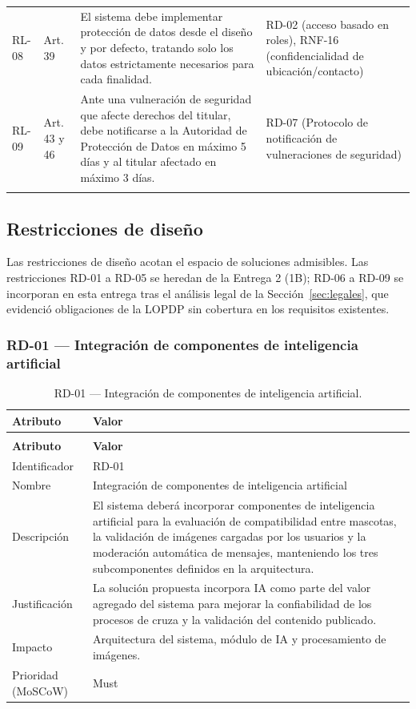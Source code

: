 \documentclass[journal,onecolumn]{IEEEtran}
\makeatletter
\newenvironment{atributos}[2]{%
	\small
	\begin{longtable}{@{}>{\raggedright\arraybackslash}p{4.2cm} >{\raggedright\arraybackslash}p{11.2cm}@{}}
		\caption{#2}\label{tab:#1}\\
		\toprule
		\textbf{Atributo} & \textbf{Valor} \\
		\midrule
		\endfirsthead
		\multicolumn{2}{@{}l}{\small\itshape (continuación)}\\
		\toprule
		\textbf{Atributo} & \textbf{Valor} \\
		\midrule
		\endhead
		\bottomrule
		\endlastfoot
	}{%
	\end{longtable}
	\normalsize
}
\makeatother
\begin{document}
\begin{table}[H]
\begin{tabularx}{\textwidth}{@{}p{1.1cm} p{1.9cm} p{5.4cm} X@{}}
			\addlinespace
			RL-08 & Art. 39 & El sistema debe implementar protección de datos desde el diseño y por defecto, tratando solo los datos estrictamente necesarios para cada finalidad. & RD-02 (acceso basado en roles), RNF-16 (confidencialidad de ubicación/contacto) \\
			\addlinespace
			RL-09 & Art. 43 y 46 & Ante una vulneración de seguridad que afecte derechos del titular, debe notificarse a la Autoridad de Protección de Datos en máximo 5 días y al titular afectado en máximo 3 días. & RD-07 (Protocolo de notificación de vulneraciones de seguridad) \\
			\addlinespace
			\bottomrule
		\end{tabularx}
	\end{table}
	
	\subsection{Restricciones de diseño}
	\label{sec:restricciones}
	
	Las restricciones de diseño acotan el espacio de soluciones admisibles. Las
	restricciones RD-01 a RD-05 se heredan de la Entrega 2 (1B); RD-06 a RD-09 se
	incorporan en esta entrega tras el análisis legal de la Sección~\ref{sec:legales},
	que evidenció obligaciones de la LOPDP sin cobertura en los requisitos existentes.
	
	\subsubsection{RD-01 --- Integración de componentes de inteligencia artificial}
	
	\begin{atributos}{RD-01}{RD-01 --- Integración de componentes de inteligencia artificial.}
		Identificador & RD-01 \\
		Nombre & Integración de componentes de inteligencia artificial \\
		Descripción & El sistema deberá incorporar componentes de inteligencia artificial para la evaluación de compatibilidad entre mascotas, la validación de imágenes cargadas por los usuarios y la moderación automática de mensajes, manteniendo los tres subcomponentes definidos en la arquitectura. \\
		Justificación & La solución propuesta incorpora IA como parte del valor agregado del sistema para mejorar la confiabilidad de los procesos de cruza y la validación del contenido publicado. \\
		Impacto & Arquitectura del sistema, módulo de IA y procesamiento de imágenes. \\
		Prioridad (MoSCoW) & Must \\
	\end{atributos}
	
\end{document}
